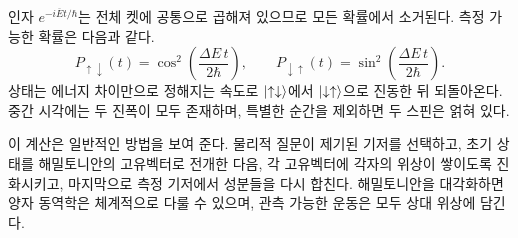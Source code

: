 인자 \(e^{-i\overline E t/\hbar}\)는 전체 켓에 공통으로 곱해져 있으므로 모든 확률에서 소거된다. 측정 가능한 확률은 다음과 같다.
\begin{equation}
P_{\uparrow\downarrow}(t)
=
\cos^2\!\left(\frac{\Delta E\,t}{2\hbar}\right),
\qquad
P_{\downarrow\uparrow}(t)
=
\sin^2\!\left(\frac{\Delta E\,t}{2\hbar}\right).
\end{equation}
상태는 에너지 차이만으로 정해지는 속도로 \(\left\lvert\uparrow\downarrow\right\rangle\)에서 \(\left\lvert\downarrow\uparrow\right\rangle\)으로 진동한 뒤 되돌아온다. 중간 시각에는 두 진폭이 모두 존재하며, 특별한 순간을 제외하면 두 스핀은 얽혀 있다.

이 계산은 일반적인 방법을 보여 준다. 물리적 질문이 제기된 기저를 선택하고, 초기 상태를 해밀토니안의 고유벡터로 전개한 다음, 각 고유벡터에 각자의 위상이 쌓이도록 진화시키고, 마지막으로 측정 기저에서 성분들을 다시 합친다. 해밀토니안을 대각화하면 양자 동역학은 체계적으로 다룰 수 있으며, 관측 가능한 운동은 모두 상대 위상에 담긴다.
